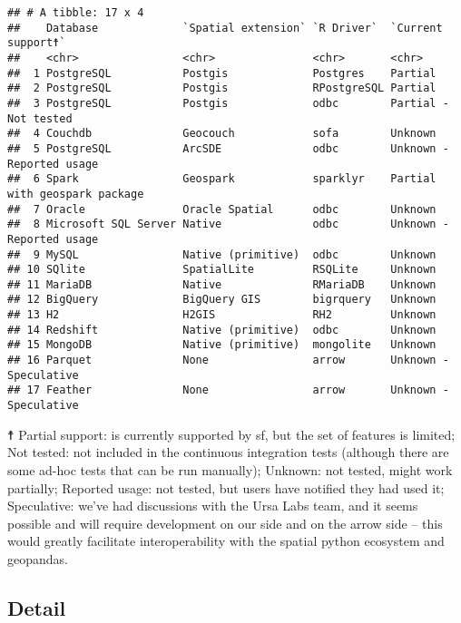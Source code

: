 \documentclass[]{article}
\begin{document}
\begin{verbatim}
## # A tibble: 17 x 4
##    Database             `Spatial extension` `R Driver`  `Current support☨`           
##    <chr>                <chr>               <chr>       <chr>                        
##  1 PostgreSQL           Postgis             Postgres    Partial                      
##  2 PostgreSQL           Postgis             RPostgreSQL Partial                      
##  3 PostgreSQL           Postgis             odbc        Partial - Not tested         
##  4 Couchdb              Geocouch            sofa        Unknown                      
##  5 PostgreSQL           ArcSDE              odbc        Unknown - Reported usage     
##  6 Spark                Geospark            sparklyr    Partial with geospark package
##  7 Oracle               Oracle Spatial      odbc        Unknown                      
##  8 Microsoft SQL Server Native              odbc        Unknown - Reported usage     
##  9 MySQL                Native (primitive)  odbc        Unknown                      
## 10 SQlite               SpatialLite         RSQLite     Unknown                      
## 11 MariaDB              Native              RMariaDB    Unknown                      
## 12 BigQuery             BigQuery GIS        bigrquery   Unknown                      
## 13 H2                   H2GIS               RH2         Unknown                      
## 14 Redshift             Native (primitive)  odbc        Unknown                      
## 15 MongoDB              Native (primitive)  mongolite   Unknown                      
## 16 Parquet              None                arrow       Unknown - Speculative        
## 17 Feather              None                arrow       Unknown - Speculative
\end{verbatim}

☨ Partial support: is currently supported by sf, but the set of features
is limited; Not tested: not included in the continuous integration tests
(although there are some ad-hoc tests that can be run manually);
Unknown: not tested, might work partially; Reported usage: not tested,
but users have notified they had used it; Speculative: we've had
discussions with the Ursa Labs team, and it seems possible and will
require development on our side and on the arrow side -- this would
greatly facilitate interoperability with the spatial python ecosystem
and geopandas.

\hypertarget{detail}{%
\subsection{Detail}\label{detail}}
\end{document}
